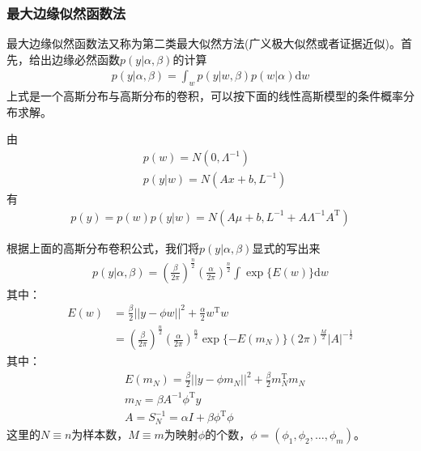     \subsubsection{最大边缘似然函数法}
        \par
        最大边缘似然函数法又称为第二类最大似然方法(广义极大似然或者证据近似)。首先，给出边缘必然函数$p(y|\alpha,\beta)$的计算
        \begin{align*}
        p(y|\alpha,\beta) = \int_w p(y|w,\beta)p(w|\alpha)\mathrm{d}w
        \end{align*}
        上式是一个高斯分布与高斯分布的卷积，可以按下面的线性高斯模型的条件概率分布求解。
        \begin{lemma}[高斯分布的卷积公式]
        由
        \begin{align*}
        &p(w) = N(0,\varLambda^{-1})\\
        &p(y|w) = N(Ax+b,L^{-1})
        \end{align*}
        有
        \begin{align*}
        p(y) = p(w) p(y|w) = N(A\mu+b,L^{-1}+A\varLambda^{-1}A^\mathrm{T})
        \end{align*}
        \end{lemma}
        \par
        根据上面的高斯分布卷积公式，我们将$p(y|\alpha,\beta)$显式的写出来
        \begin{align*}
        p(y|\alpha,\beta) = \left( \frac{\beta}{2\pi} \right)^{\frac{n}{2}} \left( \frac{\alpha}{2\pi} \right)^{\frac{n}{2}} \int\exp\{E(w)\}\mathrm{d}w
        \end{align*}
        其中：
        \begin{align*}
        E(w) &= \frac{\beta}{2}||y - \phi w||^2 + \frac{\alpha}{2} w^\mathrm{T}w \\
        &= \left( \frac{\beta}{2\pi} \right)^{\frac{n}{2}} \left( \frac{\alpha}{2\pi} \right)^{\frac{n}{2}} \exp\{-E(m_N)\}(2\pi)^\frac{M}{2} |A|^{-\frac{1}{2}}
        \end{align*}
        其中：
        \begin{align*}
        &E(m_N) = \frac{\beta}{2}||y - \phi m_N|| ^2 + \frac{\beta}{2} m_N^\mathrm{T}m_N\\
        &m_N = \beta A^{-1}\phi^\mathrm{T}y\\
        &A = S_N^{-1} = \alpha I + \beta\phi^{\mathrm{T}} \phi
        \end{align*}
        这里的$N\equiv n$为样本数，$M \equiv m$为映射$\phi$的个数，$\phi = (\phi_1,\phi_2,\dots,\phi_m)$。

